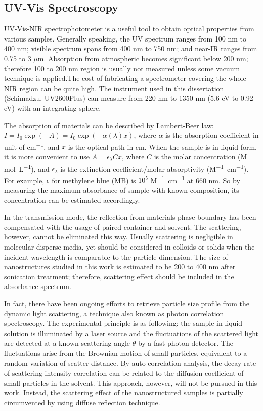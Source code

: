 \subsection{UV-Vis Spectroscopy}
UV-Vis-NIR spectrophotometer is a useful tool to obtain optical properties from various samples. Generally speaking, the UV spectrum ranges from 100 nm to 400 nm; visible spectrum spans from 400 nm to 750 nm; and near-IR ranges from 0.75 to 3 $\mu$m. Absorption from atmospheric  becomes significant below 200 nm; therefore 100 to 200 nm region is usually not measured unless some vacuum technique is applied.The cost of fabricating a spectrometer covering the whole NIR region can be quite high. The instrument used in this dissertation (Schimadzu, UV2600Plus) can measure from 220 nm to 1350 nm (5.6 eV to 0.92 eV) with an integrating sphere.

The absorption of materials can be described by Lambert-Beer law: $I = I_0 \exp(-A)=I_0\exp(-\alpha(\lambda) x)$, where $\alpha$ is the absorption coefficient in unit of \si{cm^{-1}}, and $x$ is the optical path in cm. When the sample is in liquid form, it is more convenient to use $A =\epsilon_\lambda C x$, where $C$ is the molar concentration (M = \si{\mole \per L}), and $\epsilon_\lambda$ is the extinction coefficient/molar absorptivity (\si{M^{-1} cm^{-1}}). For example, $\epsilon$ for methylene blue (MB) is $10^5$ \si{M^{-1}cm^{-1}} at 660 nm.\cite{Mills1999} So by measuring the maximum absorbance of sample with known composition, its concentration can be estimated accordingly. 

In the transmission mode, the reflection from materials phase boundary has been compensated with the usage of paired container and solvent. The scattering, however, cannot be eliminated this way. Usually scattering is negligible in molecular disperse media, yet should be considered in colloids or solids when the incident wavelength is comparable to the particle dimension. The size of nanostructures studied in this work is estimated to be 200 to 400 nm after sonication treatment; therefore, scattering effect should be included in the absorbance spectrum. 

In fact, there have been ongoing efforts to retrieve particle size profile from the dynamic light scattering, a technique also known as photon correlation spectroscopy. The experimental principle is as following: the sample in liquid solution is illuminated by a laser source and the fluctuations of the scattered light are detected at a known scattering angle $\theta$ by a fast photon detector. The fluctuations arise from the Brownian motion of small particles, equivalent to a random variation of scatter distance. By auto-correlation analysis, the decay rate of scattering intensity correlation can be related to the diffusion coefficient of small particles in the solvent.\cite{Maret1987} This approach, however, will not be pursued in this work. Instead, the scattering effect of the nanostructured samples is partially circumvented by using diffuse reflection technique. 

